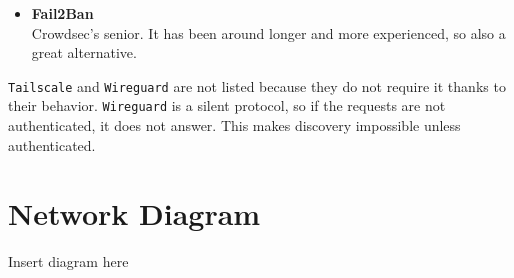 \begin{itemize}
\begin{itemize}
		\item \textbf{Fail2Ban} \\
		Crowdsec's senior. It has been around longer and more experienced, so also a great alternative.
	\end{itemize}
\end{itemize}

\texttt{Tailscale} and \texttt{Wireguard} are not listed because they do not require it thanks to their behavior. \texttt{Wireguard} is a silent protocol, so if the requests are not authenticated, it does not answer. This makes discovery impossible unless authenticated.

\section{Network Diagram}
Insert diagram here